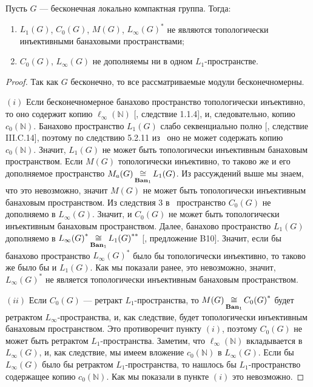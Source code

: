 \begin{proposition}\label{StdModAreNotRetrOfL1LInf} Пусть $G$ --- бесконечная
локально компактная группа. Тогда:

\begin{enumerate}[label = (\roman*)]
    \item $L_1(G)$, $C_0(G)$, $M(G)$, ${L_\infty(G)}^*$ не являются 
    топологически инъективными банаховыми пространствами;

    \item $C_0(G)$, $L_\infty(G)$ не дополняемы ни в одном $L_1$-пространстве.
\end{enumerate}
\end{proposition}
\begin{proof}
Так как $G$ бесконечно, то все рассматриваемые модули бесконечномерны.

$(i)$ Если бесконечномерное банахово пространство топологически инъективно,  то
оно содержит копию $\ell_\infty(\mathbb{N})$ [\cite{RosOnRelDisjFamOfMeas},
следствие 1.1.4], и, следовательно, копию $c_0(\mathbb{N})$. Банахово
пространство $L_1(G)$ слабо секвенциально полно [\cite{WojBanSpForAnalysts},
следствие III.C.14], поэтому по следствию 5.2.11 из~\cite{KalAlbTopicsBanSpTh}
оно не может содержать копию $c_0(\mathbb{N})$. Значит, $L_1(G)$ не может быть
топологически инъективным банаховым пространством. Если $M(G)$ топологически
инъективно, то таково же и его дополняемое пространство
$M_a(G)\mathop{\mathbin{\cong}}\limits_{\mathbf{Ban}_1}L_1(G)$. Из рассуждений выше мы знаем, что это
невозможно, значит $M(G)$ не может быть топологически инъективным банаховым
пространством. Из следствия 3 в~\cite{LauMingComplSubspInLInfOfG} пространство
$C_0(G)$ не дополняемо в $L_\infty(G)$. Значит, и $C_0(G)$ не может быть
топологически инъективным банаховым пространством. Далее, банахово пространство
$L_1(G)$ дополняемо в ${L_\infty(G)}^*\mathop{\mathbin{\cong}}\limits_{\mathbf{Ban}_1}{L_1(G)}^{**}$
[\cite{DefFloTensNorOpId}, предложение B10]. Значит, если бы банахово
пространство ${L_\infty(G)}^*$ было бы топологически инъективно, 
то таково же было бы и $L_1(G)$. Как мы показали ранее, это невозможно, 
значит, ${L_\infty(G)}^*$ не является топологически инъективным 
банаховым пространством. 

$(ii)$ Если $C_0(G)$ --- ретракт $L_1$-пространства, то
$M(G)\mathop{\mathbin{\cong}}\limits_{\mathbf{Ban}_1}{C_0(G)}^*$ будет ретрактом $L_\infty$-пространства, 
и, как следствие, будет топологически инъективным банаховым пространством. Это
противоречит пункту $(i)$, поэтому $C_0(G)$ не может быть ретрактом
$L_1$-пространства. Заметим, что $\ell_\infty(\mathbb{N})$ вкладывается в
$L_\infty(G)$, и, как следствие, мы имеем вложение $c_0(\mathbb{N})$ в
$L_\infty(G)$. Если бы $L_\infty(G)$ было бы ретрактом $L_1$-пространства, то
нашлось бы $L_1$-пространство содержащее копию $c_0(\mathbb{N})$. Как мы
показали в пункте $(i)$ это невозможно.
\end{proof}

